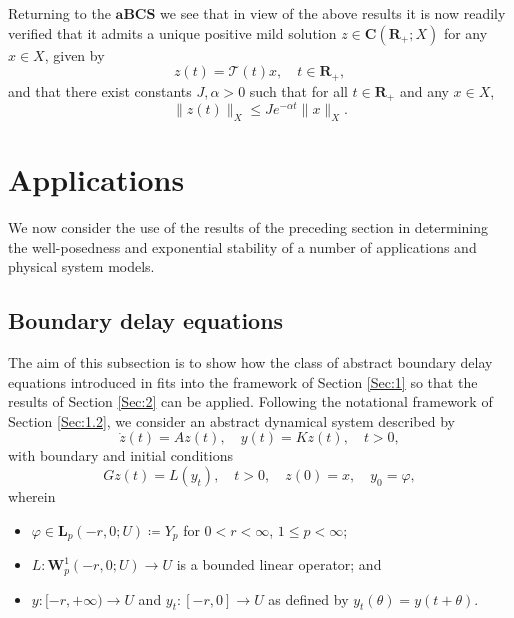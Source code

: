 \documentclass[a4paper,11pt,reqno]{amsart}
\def\calT{{\mathcal{T}}}
\def\R{\mathbf{R}}
\theoremstyle{plain}
\numberwithin{equation}{section}
\begin{document}
Returning to the $\mathbf{aBCS}$ we see that in view of the above results it is now readily verified that it admits a unique positive mild solution $z\in \bm{C}(\R_+;{X})$ for any $x\in X$, given by
\begin{equation*}
{z}(t) =\calT(t)x,\quad t\in\R_+,
\end{equation*}
and that there exist constants $J, \alpha>0$ such that for all $t\in\R_+$ and any $x\in X$,
\begin{equation*}
\| z(t)\|_{X}\le J e^{-\alpha t}\| x\|_{ X}.
\end{equation*}

\section{Applications}\label{Sec:3}

We now consider the use of the results of the preceding section in determining the well-posedness and exponential stability of a number of applications and physical system models.

\subsection{Boundary delay equations}

The aim of this subsection is to show how the class of abstract boundary delay equations introduced in \cite{GANTOUH2026106307} fits into the framework of Section \ref{Sec:1} so that the results of Section \ref{Sec:2} can be applied. Following the notational framework of Section \ref{Sec:1.2}, we consider an abstract dynamical system described by
\begin{equation}\label{DEq}
\dot{z}(t)=Az (t),\quad y(t)=K z(t),\quad t>0,
\end{equation}
with boundary and initial conditions
\begin{equation}\label{DEqx}
Gz(t)= L(y_t),\quad t>0,\quad z(0)=x,\quad y_0=\varphi,
\end{equation}
wherein
\begin{itemize}[leftmargin=*,align=left,labelwidth=\parindent]
\item $\varphi\in \bm{L}_p(-r,0;U)\coloneqq Y_p$ for $0<r<\infty$, $1\le p<\infty$;
\item $L:\bm{W}^{1}_p(-r,0;U)\to U$ is a bounded linear operator; and
\item $y:[-r,+\infty)\to U$ and $y_t:[-r,0]\to U$ as defined by $y_t(\theta)=y(t+\theta)$.
\end{itemize}
\end{document}
